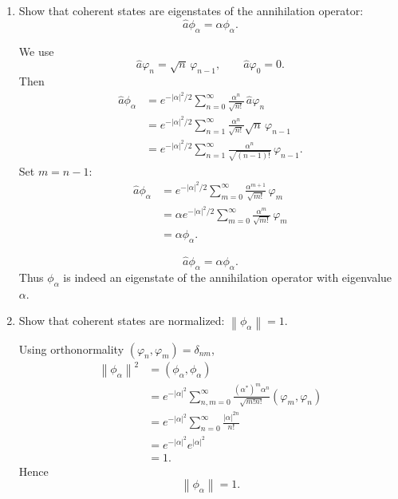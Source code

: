 \documentclass[11pt,a4paper]{scrartcl}
\newcommand{\norm}[1]{\left\lVert #1 \right\rVert}
\begin{document}
\begin{enumerate}[label=(\alph*)]
    \item Show that coherent states are eigenstates of the annihilation operator:
    \[
    \hat a \phi_\alpha = \alpha \phi_\alpha.
    \]

    \begin{calculationbox}
    We use
    \[
    \hat a \varphi_n = \sqrt{n}\,\varphi_{n-1}, \qquad \hat a\varphi_0=0.
    \]
    Then
    \begin{align*}
        \hat a \phi_\alpha
        &= e^{-|\alpha|^2/2}\sum_{n=0}^{\infty}\frac{\alpha^n}{\sqrt{n!}}\,\hat a\varphi_n \\
        &= e^{-|\alpha|^2/2}\sum_{n=1}^{\infty}\frac{\alpha^n}{\sqrt{n!}}\sqrt{n}\,\varphi_{n-1} \\
        &= e^{-|\alpha|^2/2}\sum_{n=1}^{\infty}\frac{\alpha^n}{\sqrt{(n-1)!}}\,\varphi_{n-1}.
    \end{align*}
    Set $m=n-1$:
    \begin{align*}
        \hat a \phi_\alpha
        &= e^{-|\alpha|^2/2}\sum_{m=0}^{\infty}\frac{\alpha^{m+1}}{\sqrt{m!}}\,\varphi_m \\
        &= \alpha e^{-|\alpha|^2/2}\sum_{m=0}^{\infty}\frac{\alpha^m}{\sqrt{m!}}\,\varphi_m \\
        &= \alpha \phi_\alpha.
    \end{align*}
    \end{calculationbox}

    \begin{answerbox}
    \[
    \boxed{\hat a\phi_\alpha=\alpha\phi_\alpha.}
    \]
    Thus $\phi_\alpha$ is indeed an eigenstate of the annihilation operator with eigenvalue $\alpha$.
    \end{answerbox}

    \item Show that coherent states are normalized: $\norm{\phi_\alpha}=1$.

    \begin{solutionbox}
    Using orthonormality $(\varphi_n,\varphi_m)=\delta_{nm}$,
    \begin{align*}
        \norm{\phi_\alpha}^2
        &= (\phi_\alpha,\phi_\alpha) \\
        &= e^{-|\alpha|^2}
        \sum_{n,m=0}^{\infty}
        \frac{(\alpha^*)^m \alpha^n}{\sqrt{m!n!}}(\varphi_m,\varphi_n) \\
        &= e^{-|\alpha|^2}
        \sum_{n=0}^{\infty}
        \frac{|\alpha|^{2n}}{n!} \\
        &= e^{-|\alpha|^2} e^{|\alpha|^2} \\
        &= 1.
    \end{align*}
    Hence
    \[
    \boxed{\norm{\phi_\alpha}=1.}
    \]
    \end{solutionbox}


\end{enumerate}
\end{document}
